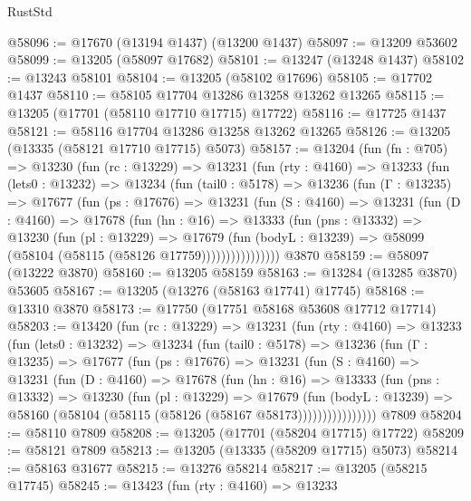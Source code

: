 \begin{lexlean}{RustStd}
\begin{coremodule}
@58096 := @17670 (@13194 @1437) (@13200 @1437)
@58097 := @13209 @53602
@58099 := @13205 (@58097 @17682)
@58101 := @13247 (@13248 @1437)
@58102 := @13243 @58101
@58104 := @13205 (@58102 @17696)
@58105 := @17702 @1437
@58110 := @58105 @17704 @13286 @13258 @13262 @13265
@58115 := @13205 (@17701 (@58110 @17710 @17715) @17722)
@58116 := @17725 @1437
@58121 := @58116 @17704 @13286 @13258 @13262 @13265
@58126 := @13205 (@13335 (@58121 @17710 @17715) @5073)
@58157 := @13204
    (fun (fn : @705) =>
    @13230
      (fun (rc : @13229) =>
      @13231
        (fun (rty : @4160) =>
        @13233
          (fun (lets0 : @13232) =>
          @13234
            (fun (tail0 : @5178) =>
            @13236
              (fun (Γ : @13235) =>
              @17677
                (fun (ps : @17676) =>
                @13231
                  (fun (S : @4160) =>
                  @13231
                    (fun (D : @4160) =>
                    @17678
                      (fun (hn : @16) =>
                      @13333
                        (fun (pns : @13332) =>
                        @13230
                          (fun (pl : @13229) =>
                          @17679
                            (fun (bodyL : @13239) =>
                            @58099 (@58104 (@58115 (@58126 @17759))))))))))))))))
    @3870
@58159 := @58097 (@13222 @3870)
@58160 := @13205 @58159
@58163 := @13284 (@13285 @3870) @53605
@58167 := @13205 (@13276 (@58163 @17741) @17745)
@58168 := @13310 @3870
@58173 := @17750 (@17751 @58168 @53608 @17712 @17714)
@58203 := @13420
    (fun (rc : @13229) =>
    @13231
      (fun (rty : @4160) =>
      @13233
        (fun (lets0 : @13232) =>
        @13234
          (fun (tail0 : @5178) =>
          @13236
            (fun (Γ : @13235) =>
            @17677
              (fun (ps : @17676) =>
              @13231
                (fun (S : @4160) =>
                @13231
                  (fun (D : @4160) =>
                  @17678
                    (fun (hn : @16) =>
                    @13333
                      (fun (pns : @13332) =>
                      @13230
                        (fun (pl : @13229) =>
                        @17679
                          (fun (bodyL : @13239) =>
                          @58160 (@58104 (@58115 (@58126 (@58167 @58173))))))))))))))))
    @7809
@58204 := @58110 @7809
@58208 := @13205 (@17701 (@58204 @17715) @17722)
@58209 := @58121 @7809
@58213 := @13205 (@13335 (@58209 @17715) @5073)
@58214 := @58163 @31677
@58215 := @13276 @58214
@58217 := @13205 (@58215 @17745)
@58245 := @13423
    (fun (rty : @4160) =>
    @13233

\end{coremodule}
\end{lexlean}
